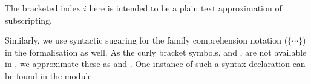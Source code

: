 The bracketed index $i$ here is intended to be a plain text
approximation of subscripting.

Similarly, we use syntactic sugaring for the family comprehension notation ($\{ \cdots \}$) in
the \veragda{} formalisation as well. As the curly bracket symbols, \fnname{\{} and
\fnname{\}}, are not available in \veragda{}, we approximate these as \fnname{\textlquill} and
\fnname{\textrquill}. One instance of such a syntax declaration can be found in the 
module.

\begin{center}
\begin{code}%
\>[0]\AgdaSpace{}%
\AgdaSymbol{:}\AgdaSpace{}%
\AgdaSymbol{\{}\AgdaSpace{}%
\AgdaSymbol{:}\AgdaSpace{}%
\AgdaSpace{}%
\AgdaSymbol{\}}\AgdaSpace{}%
\AgdaSymbol{\{}\AgdaSpace{}%
\AgdaSymbol{:}\AgdaSpace{}%
\AgdaSpace{}%
\AgdaSymbol{\}}\AgdaSpace{}%
\AgdaSpace{}%
\AgdaSymbol{(}\AgdaSpace{}%
\AgdaSymbol{:}\AgdaSpace{}%
\AgdaSpace{}%
\AgdaSpace{}%
\AgdaSymbol{)}\AgdaSpace{}%
\AgdaSpace{}%
\AgdaSymbol{(}\AgdaSpace{}%
\AgdaSymbol{:}\AgdaSpace{}%
\AgdaSpace{}%
\AgdaSpace{}%
\AgdaSymbol{)}\AgdaSpace{}%
\AgdaSpace{}%
\AgdaSpace{}%
\AgdaSpace{}%
\<%
\\
\>[0]\AgdaSpace{}%
\AgdaSpace{}%
\AgdaSpace{}%
\AgdaSymbol{=}\AgdaSpace{}%
\AgdaSpace{}%
\AgdaOperator{\AgdaInductiveConstructor{,}}\AgdaSpace{}%
\AgdaSpace{}%
\AgdaSpace{}%
\AgdaSpace{}\<%
\\
%
\\[\AgdaEmptyExtraSkip]%
\>[0]\AgdaSpace{}%
\AgdaSpace{}%
\AgdaSpace{}%
\AgdaSpace{}%
\AgdaSpace{}%
\AgdaSymbol{)}\AgdaSpace{}%
\AgdaSpace{}%
\AgdaSymbol{=}\AgdaSpace{}%
\AgdaSpace{}%
\AgdaSpace{}%
\AgdaSpace{}%
\AgdaSpace{}%
\AgdaSpace{}%
\AgdaSpace{}%
\<%
\end{code}
\end{center}



